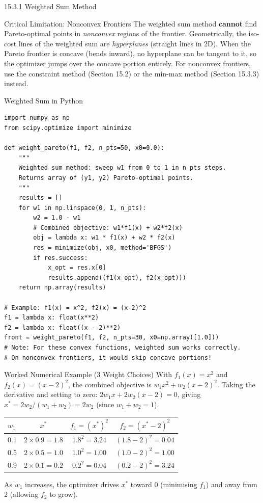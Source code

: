 \documentclass[aspectratio=169,10pt]{beamer}
\begin{document}
\begin{frame}[allowframebreaks]{15.3.1 Weighted Sum Method}
\begin{alertblock}{Critical Limitation: Nonconvex Frontiers}
  The weighted sum method \textbf{cannot} find Pareto-optimal points in
  \emph{nonconvex} regions of the frontier.  Geometrically, the iso-cost
  lines of the weighted sum are \emph{hyperplanes} (straight lines in 2D).
  When the Pareto frontier is concave (bends inward), no hyperplane can be
  tangent to it, so the optimizer jumps over the concave portion entirely.
  For nonconvex frontiers, use the constraint method (Section 15.2) or
  the min-max method (Section 15.3.3) instead.
\end{alertblock}

\end{frame}

\begin{frame}[fragile]{Weighted Sum in Python}

\begin{lstlisting}
import numpy as np
from scipy.optimize import minimize

def weight_pareto(f1, f2, n_pts=50, x0=0.0):
    """
    Weighted sum method: sweep w1 from 0 to 1 in n_pts steps.
    Returns array of (y1, y2) Pareto-optimal points.
    """
    results = []
    for w1 in np.linspace(0, 1, n_pts):
        w2 = 1.0 - w1
        # Combined objective: w1*f1(x) + w2*f2(x)
        obj = lambda x: w1 * f1(x) + w2 * f2(x)
        res = minimize(obj, x0, method='BFGS')
        if res.success:
            x_opt = res.x[0]
            results.append((f1(x_opt), f2(x_opt)))
    return np.array(results)

# Example: f1(x) = x^2, f2(x) = (x-2)^2
f1 = lambda x: float(x**2)
f2 = lambda x: float((x - 2)**2)
front = weight_pareto(f1, f2, n_pts=30, x0=np.array([1.0]))
# Note: For these convex functions, weighted sum works correctly.
# On nonconvex frontiers, it would skip concave portions!
\end{lstlisting}

\begin{exampleblock}{Worked Numerical Example (3 Weight Choices)}
  With $f_1(x) = x^2$ and $f_2(x) = (x-2)^2$, the combined objective is
  $w_1 x^2 + w_2 (x-2)^2$.  Taking the derivative and setting to zero:
  $2 w_1 x + 2 w_2 (x-2) = 0$, giving $x^* = 2w_2 / (w_1 + w_2) = 2w_2$
  (since $w_1 + w_2 = 1$).

  \begin{center}
  \begin{tabular}{lccc}
  \toprule
  $w_1$ & $x^*$ & $f_1 = (x^*)^2$ & $f_2 = (x^*-2)^2$ \\
  \midrule
  0.1 & $2 \times 0.9 = 1.8$ & $1.8^2 = 3.24$ & $(1.8-2)^2 = 0.04$ \\
  0.5 & $2 \times 0.5 = 1.0$ & $1.0^2 = 1.00$ & $(1.0-2)^2 = 1.00$ \\
  0.9 & $2 \times 0.1 = 0.2$ & $0.2^2 = 0.04$ & $(0.2-2)^2 = 3.24$ \\
  \bottomrule
  \end{tabular}
  \end{center}
  As $w_1$ increases, the optimizer drives $x^*$ toward 0 (minimising $f_1$)
  and away from 2 (allowing $f_2$ to grow).
\end{exampleblock}


\end{frame}
\end{document}
